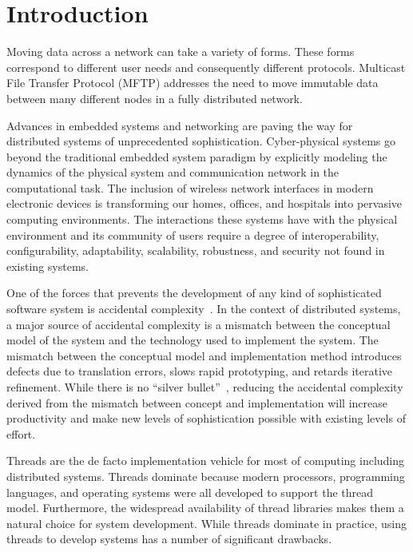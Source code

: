 \documentclass[letterpaper]{article}
\begin{document}
\section{Introduction}
Moving data across a network can take a variety of forms. These forms correspond to different user needs and consequently different protocols. Multicast File Transfer Protocol (MFTP) addresses the need to move immutable data between many different nodes in a fully distributed network. 

Advances in embedded systems and networking are paving the way for distributed systems of unprecedented sophistication.
Cyber-physical systems go beyond the traditional embedded system paradigm by explicitly modeling the dynamics of the physical system and communication network in the computational task.
The inclusion of wireless network interfaces in modern electronic devices is transforming our homes, offices, and hospitals into pervasive computing environments.
The interactions these systems have with the physical environment and its community of users require a degree of interoperability, configurability, adaptability, scalability, robustness, and security not found in existing systems.

One of the forces that prevents the development of any kind of sophisticated software system is accidental complexity~\cite{brooks_nsb}.
In the context of distributed systems, a major source of accidental complexity is a mismatch between the conceptual model of the system and the technology used to implement the system.
The mismatch between the conceptual model and implementation method introduces defects due to translation errors, slows rapid prototyping, and retards iterative refinement.
While there is no ``silver bullet''~\cite{brooks_nsb}, reducing the accidental complexity derived from the mismatch between concept and implementation will increase productivity and make new levels of sophistication possible with existing levels of effort.

Threads are the de facto implementation vehicle for most of computing including distributed systems.
Threads dominate because modern processors, programming languages, and operating systems were all developed to support the thread model.
Furthermore, the widespread availability of thread libraries makes them a natural choice for system development.
While threads dominate in practice, using threads to develop systems has a number of significant drawbacks.
\end{document}

